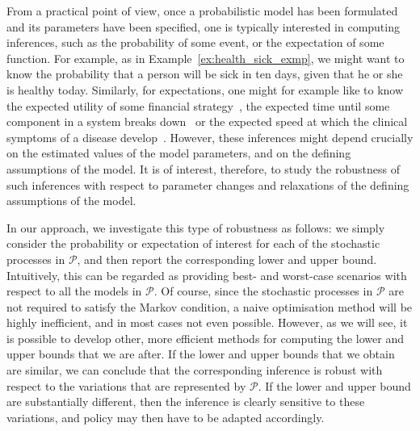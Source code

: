\documentclass[10pt,a4paper]{paper}
\theoremstyle{definition}
\begin{document}
From a practical point of view, once a probabilistic model has been formulated and its parameters have been specified, one is typically interested in computing inferences, such as the probability of some event, or the expectation of some function. For example, as in Example~\ref{ex:health_sick_exmp}, we might want to know the probability that a person will be sick in ten days, given that he or she is healthy today.
Similarly, for expectations, one might for example like to know the expected utility of some financial strategy~\cite{sass2004optimizing}, the expected time until some component in a system breaks down~\cite{besnard2010approach} or the expected speed at which the clinical symptoms of a disease develop~\cite{duffy1995estimation}. However, these inferences might depend crucially on the estimated values of the model parameters, and on the defining assumptions of the model.
It is of interest, therefore, to study the robustness of such inferences with respect to parameter changes and relaxations of the defining assumptions of the model.

In our approach, we investigate this type of robustness as follows: we simply consider the probability or expectation of interest for each of the stochastic processes in $\mathcal{P}$, and then report the corresponding lower and upper bound. Intuitively, this can be regarded as providing best- and worst-case scenarios with respect to all the models in $\mathcal{P}$.
Of course, since the stochastic processes in $\mathcal{P}$ are not required to satisfy the Markov condition, a naive optimisation method will be highly inefficient, and in most cases not even possible. However, as we will see, it is possible to develop other, more efficient methods for computing the lower and upper bounds that we are after. If the lower and upper bounds that we obtain are similar, we can conclude that the corresponding inference is robust with respect to the variations that are represented by $\mathcal{P}$. If the lower and upper bound are substantially different, then the inference is clearly sensitive to these variations, and policy may then have to be adapted accordingly. 
\end{document}
